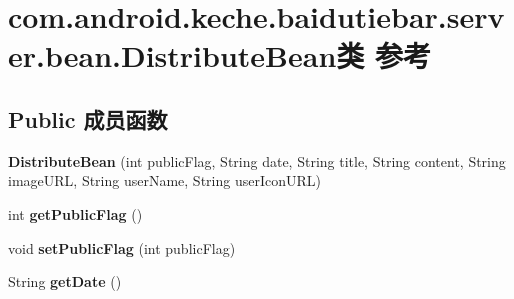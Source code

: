 \hypertarget{classcom_1_1android_1_1keche_1_1baidutiebar_1_1server_1_1bean_1_1_distribute_bean}{}\section{com.\+android.\+keche.\+baidutiebar.\+server.\+bean.\+Distribute\+Bean类 参考}
\label{classcom_1_1android_1_1keche_1_1baidutiebar_1_1server_1_1bean_1_1_distribute_bean}
\subsection*{Public 成员函数}
\begin{DoxyCompactItemize}
\item 
\mbox{\label{classcom_1_1android_1_1keche_1_1baidutiebar_1_1server_1_1bean_1_1_distribute_bean_a3cb82a1dd85207714821e7b4dc385d4d}} 
{\bfseries Distribute\+Bean} (int public\+Flag, String date, String title, String content, String image\+U\+RL, String user\+Name, String user\+Icon\+U\+RL)
\item 
\mbox{\label{classcom_1_1android_1_1keche_1_1baidutiebar_1_1server_1_1bean_1_1_distribute_bean_a2decd9b13abe39bed82cdbe01acac0c4}} 
int {\bfseries get\+Public\+Flag} ()
\item 
\mbox{\label{classcom_1_1android_1_1keche_1_1baidutiebar_1_1server_1_1bean_1_1_distribute_bean_a36ad0705cd016e5358303e52b058d5cb}} 
void {\bfseries set\+Public\+Flag} (int public\+Flag)
\item 
\mbox{\label{classcom_1_1android_1_1keche_1_1baidutiebar_1_1server_1_1bean_1_1_distribute_bean_a0457147c53e6867a129aba54edcb9d5c}} 
String {\bfseries get\+Date} ()
\item 
\mbox{\label{classcom_1_1android_1_1keche_1_1baidutiebar_1_1server_1_1bean_1_1_distribute_bean_a194ca2e08940b5e48ef07792d663500d}} 

\end{DoxyCompactItemize}
